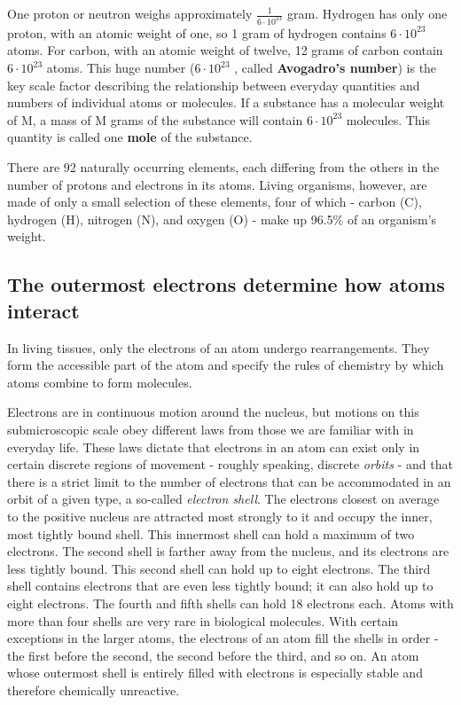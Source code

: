 One proton or neutron weighs approximately $\frac{1}{6 \cdot 10^{23}}$ gram. Hydrogen has
only one proton, with an atomic weight of one, so 1 gram of hydrogen
contains $6 \cdot 10^{23}$ atoms. For carbon, with an atomic weight of twelve,
12 grams of carbon contain $6 \cdot 10^{23}$ atoms. This huge number ($6 \cdot 10^{23}$ ,
called \textbf{Avogadro’s number}) is the key scale factor describing the relationship
between everyday quantities and numbers of individual atoms
or molecules. If a substance has a molecular weight of M, a mass of M
grams of the substance will contain $6 \cdot 10^{23}$ molecules. This quantity is
called one \textbf{mole} of the substance.

There are 92 naturally occurring elements, each differing from the others
in the number of protons and electrons in its atoms. Living organisms,
however, are made of only a small selection of these elements, four of
which - carbon (C), hydrogen (H), nitrogen (N), and oxygen (O) - make up
96.5\% of an organism’s weight.


\subsection{The outermost electrons determine how atoms interact}

In living tissues, only the electrons of an atom undergo rearrangements.
They form the accessible part of the atom and specify the rules of
chemistry by which atoms combine to form molecules.

Electrons are in continuous motion around the nucleus, but motions on
this submicroscopic scale obey different laws from those we are familiar
with in everyday life. These laws dictate that electrons in an atom can exist
only in certain discrete regions of movement - roughly speaking, discrete
\textit{orbits} - and that there is a strict limit to the number of electrons that can
be accommodated in an orbit of a given type, a so-called \textit{electron shell}.
The electrons closest on average to the positive nucleus are attracted
most strongly to it and occupy the inner, most tightly bound shell. This
innermost shell can hold a maximum of two electrons. The second shell
is farther away from the nucleus, and its electrons are less tightly bound.
This second shell can hold up to eight electrons. The third shell contains
electrons that are even less tightly bound; it can also hold up to eight
electrons. The fourth and fifth shells can hold 18 electrons each. Atoms
with more than four shells are very rare in biological molecules.
With certain exceptions in the larger atoms, the electrons of an atom fill
the shells in order - the first before the second, the second before the third,
and so on. An atom whose outermost shell is entirely filled with electrons
is especially stable and therefore chemically unreactive.

